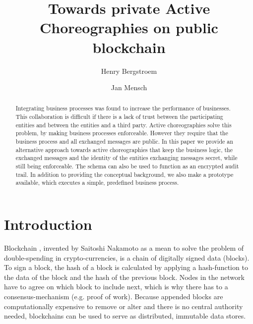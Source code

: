 \documentclass[runningheads]{llncs}
\begin{document}
%
\title{Towards private Active Choreographies on public blockchain}
%
%
\author{Henry Bergstroem \and
Jan Mensch}
%
%


%
\maketitle              %
%
\begin{abstract}


Integrating business processes was found to increase the performance of businesses. This collaboration is difficult if there is a lack of trust between the participating entities and between the entities and a third party. Active choreographies solve this problem, by making business processes enforceable. However they require that the business process and all exchanged messages are public. In this paper we provide an alternative approach towards active choreographies that keep the business logic, the exchanged messages and the identity of the entities exchanging messages secret, while still being enforceable. The schema can also be used to function as an encrypted audit trail. In addition to providing the conceptual background, we also make a prototype available, which executes a simple, predefined business process.


\end{abstract}



\section{Introduction} \label{intro}

Blockchain \cite{nakamoto2008bitcoin}, invented by Saitoshi Nakamoto as a mean to solve the problem of double-spending in crypto-currencies, is a chain of digitally signed data (blocks). To sign a block, the hash of a block is calculated by applying a hash-function to the data of the block and the hash of the previous block. Nodes in the network have to agree on which block to include next, which is why there has to a consensus-mechanism (e.g. proof of work). Because appended blocks are computationally expensive to remove or alter and there is no central authority needed, blockchains can be used to serve as distributed, immutable data stores.
\end{document}
